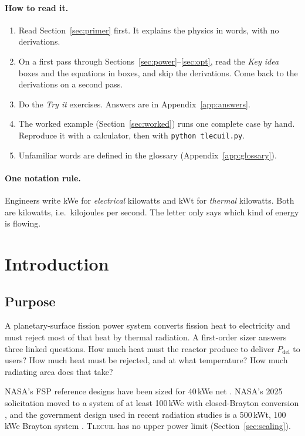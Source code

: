 \documentclass[11pt]{article}
\numberwithin{equation}{section}
\numberwithin{table}{section}
\newcommand{\tlecuil}{\textsc{Tlecuil}}
\newcommand{\Pdel}{P_\text{del}}
\begin{document}
\paragraph{How to read it.}
\begin{enumerate}
  \item Read Section~\ref{sec:primer} first. It explains the physics in words, with no
        derivations.
  \item On a first pass through Sections~\ref{sec:power}--\ref{sec:opt}, read the
        \emph{Key idea} boxes and the equations in boxes, and skip the derivations.
        Come back to the derivations on a second pass.
  \item Do the \emph{Try it} exercises. Answers are in Appendix~\ref{app:answers}.
  \item The worked example (Section~\ref{sec:worked}) runs one complete case by hand.
        Reproduce it with a calculator, then with \texttt{python tlecuil.py}.
  \item Unfamiliar words are defined in the glossary (Appendix~\ref{app:glossary}).
\end{enumerate}

\paragraph{One notation rule.} Engineers write kWe for \emph{electrical} kilowatts and
kWt for \emph{thermal} kilowatts. Both are kilowatts, i.e.\ kilojoules per second. The
letter only says which kind of energy is flowing.

\section{Introduction}\label{sec:intro}

\subsection{Purpose}
A planetary-surface fission power system converts fission heat to electricity and
must reject most of that heat by thermal radiation. A first-order sizer answers
three linked questions. How much heat must the reactor produce to deliver $\Pdel$
to users? How much heat must be rejected, and at what temperature? How much
radiating area does that take?

NASA's FSP reference designs have been sized for 40\,kWe net
\cite{fsp2010icd,mason2025trades}. NASA's 2025 solicitation moved to a system of
at least 100\,kWe with closed-Brayton conversion \cite{nasa2025fsp}, and the
government design used in recent radiation studies is a 500\,kWt, 100\,kWe
Brayton system \cite{wilson2026dose}. \tlecuil{} has no upper power limit
(Section~\ref{sec:scaling}).
\end{document}
